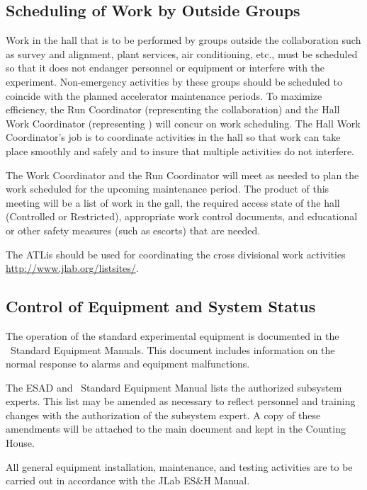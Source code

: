 \documentclass[11pt]{article}
\begin{document}
\subsection{Scheduling of Work by Outside Groups }
\indent

Work in the hall that is to be performed by groups outside the collaboration 
such as survey and alignment, plant services, air conditioning, etc., 
must be scheduled so that it does not 
endanger personnel or equipment or interfere with the experiment.
Non-emergency activities by these groups should be
scheduled to coincide with the planned accelerator maintenance periods. 
To maximize efficiency, the Run Coordinator (representing the collaboration)
and the Hall Work Coordinator (representing \HALL) will concur
on work scheduling.
The Hall Work Coordinator's job is to 
coordinate activities in the hall so that work can take place smoothly 
and safely and to insure that multiple activities do not interfere. 

The Work Coordinator and the Run
Coordinator will meet as needed to plan the work
scheduled for the upcoming maintenance period.
The product of this meeting will be
a list of work in the gall, the required access state of the
hall (Controlled or Restricted), appropriate work 
control documents, and educational or other
safety measures (such as escorts) that are needed.

The ATLis should be used for coordinating the cross divisional work activities
\url{http://www.jlab.org/listsites/}. 

\subsection{Control of Equipment and System Status}
\indent

The operation of the standard experimental equipment is documented in the 
\HALL\ Standard Equipment Manuals.
This document includes information on the
normal response to alarms and equipment malfunctions.
 
The ESAD and \HALL\ Standard Equipment Manual lists 
the authorized subsystem experts. This list may be amended as necessary to 
reflect personnel and training changes with the 
authorization of the subsystem expert. A copy of these 
amendments will be attached to the main document and kept in the
Counting House.

All general equipment installation, maintenance, and testing activities 
are to be carried out in accordance with the JLab ES\&H Manual.
\end{document}

